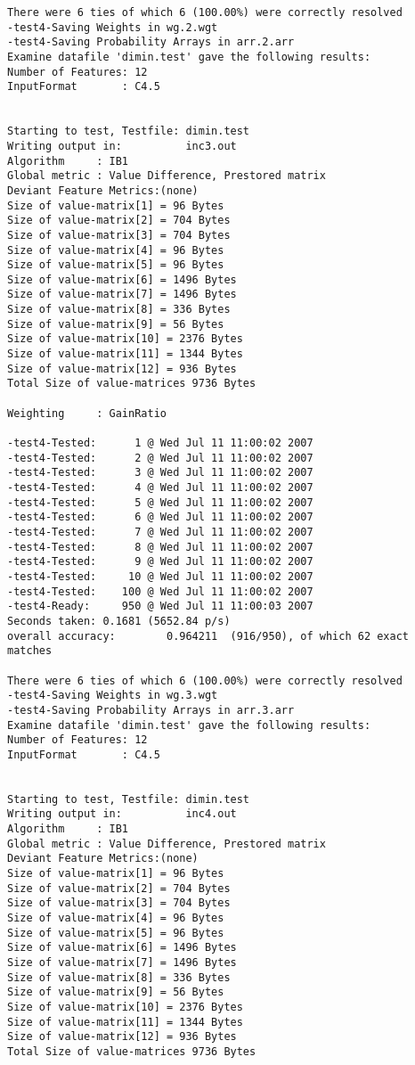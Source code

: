 \documentclass{report}
\begin{document}
\begin{footnotesize}
\begin{verbatim}
There were 6 ties of which 6 (100.00%) were correctly resolved
-test4-Saving Weights in wg.2.wgt
-test4-Saving Probability Arrays in arr.2.arr
Examine datafile 'dimin.test' gave the following results:
Number of Features: 12
InputFormat       : C4.5


Starting to test, Testfile: dimin.test
Writing output in:          inc3.out
Algorithm     : IB1
Global metric : Value Difference, Prestored matrix
Deviant Feature Metrics:(none)
Size of value-matrix[1] = 96 Bytes 
Size of value-matrix[2] = 704 Bytes 
Size of value-matrix[3] = 704 Bytes 
Size of value-matrix[4] = 96 Bytes 
Size of value-matrix[5] = 96 Bytes 
Size of value-matrix[6] = 1496 Bytes 
Size of value-matrix[7] = 1496 Bytes 
Size of value-matrix[8] = 336 Bytes 
Size of value-matrix[9] = 56 Bytes 
Size of value-matrix[10] = 2376 Bytes 
Size of value-matrix[11] = 1344 Bytes 
Size of value-matrix[12] = 936 Bytes 
Total Size of value-matrices 9736 Bytes 

Weighting     : GainRatio

-test4-Tested:      1 @ Wed Jul 11 11:00:02 2007
-test4-Tested:      2 @ Wed Jul 11 11:00:02 2007
-test4-Tested:      3 @ Wed Jul 11 11:00:02 2007
-test4-Tested:      4 @ Wed Jul 11 11:00:02 2007
-test4-Tested:      5 @ Wed Jul 11 11:00:02 2007
-test4-Tested:      6 @ Wed Jul 11 11:00:02 2007
-test4-Tested:      7 @ Wed Jul 11 11:00:02 2007
-test4-Tested:      8 @ Wed Jul 11 11:00:02 2007
-test4-Tested:      9 @ Wed Jul 11 11:00:02 2007
-test4-Tested:     10 @ Wed Jul 11 11:00:02 2007
-test4-Tested:    100 @ Wed Jul 11 11:00:02 2007
-test4-Ready:     950 @ Wed Jul 11 11:00:03 2007
Seconds taken: 0.1681 (5652.84 p/s)
overall accuracy:        0.964211  (916/950), of which 62 exact matches 

There were 6 ties of which 6 (100.00%) were correctly resolved
-test4-Saving Weights in wg.3.wgt
-test4-Saving Probability Arrays in arr.3.arr
Examine datafile 'dimin.test' gave the following results:
Number of Features: 12
InputFormat       : C4.5


Starting to test, Testfile: dimin.test
Writing output in:          inc4.out
Algorithm     : IB1
Global metric : Value Difference, Prestored matrix
Deviant Feature Metrics:(none)
Size of value-matrix[1] = 96 Bytes 
Size of value-matrix[2] = 704 Bytes 
Size of value-matrix[3] = 704 Bytes 
Size of value-matrix[4] = 96 Bytes 
Size of value-matrix[5] = 96 Bytes 
Size of value-matrix[6] = 1496 Bytes 
Size of value-matrix[7] = 1496 Bytes 
Size of value-matrix[8] = 336 Bytes 
Size of value-matrix[9] = 56 Bytes 
Size of value-matrix[10] = 2376 Bytes 
Size of value-matrix[11] = 1344 Bytes 
Size of value-matrix[12] = 936 Bytes 
Total Size of value-matrices 9736 Bytes 


\end{verbatim}
\end{footnotesize}
\end{document}
